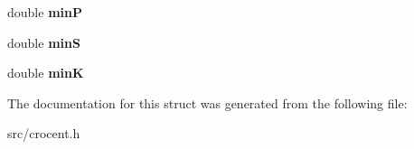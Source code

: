 \begin{DoxyCompactItemize}
\item 
\hypertarget{structflowrestriction_a7205d6893bb03e40180282d917d52009}{double {\bfseries min\-P}}\label{structflowrestriction_a7205d6893bb03e40180282d917d52009}

\item 
\hypertarget{structflowrestriction_a699c29a7880d7263c350ac84dd157099}{double {\bfseries min\-S}}\label{structflowrestriction_a699c29a7880d7263c350ac84dd157099}

\item 
\hypertarget{structflowrestriction_ae0b6d22d804c6582d2fd80d88bacf269}{double {\bfseries min\-K}}\label{structflowrestriction_ae0b6d22d804c6582d2fd80d88bacf269}

\end{DoxyCompactItemize}


The documentation for this struct was generated from the following file\-:\begin{DoxyCompactItemize}
\item 
src/crocent.\-h\end{DoxyCompactItemize}
